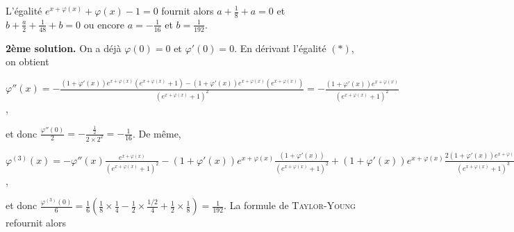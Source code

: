 {{L'égalité $e^{x+\varphi(x)}+\varphi(x)-1=0$ fournit alors $a+ \frac{1}{8}+a=0$ et $b+ \frac{a}{2}+ \frac{1}{48}+b=0$ ou encore $a=- \frac{1}{16}$ et $b= \frac{1}{192}$.

\textbf{2ème solution.} On a déjà $\varphi(0)=0$ et $\varphi'(0)=0$. En dérivant l'égalité $(*)$, on obtient

\begin{center}
$\varphi''(x)=- \frac{(1+\varphi'(x))e^{x+\varphi(x)}(e^{x+\varphi(x)}+1)-(1+\varphi'(x))e^{x+\varphi(x)}(e^{x+\varphi(x)})}{\left(e^{x+\varphi(x)}+1\right)^2}=- \frac{(1+\varphi'(x))e^{x+\varphi(x)}}{\left(e^{x+\varphi(x)}+1\right)^2}$,
\end{center}

et donc $ \frac{\varphi''(0)}{2}=- \frac{ \frac{1}{2}}{2\times2^2}=- \frac{1}{16}$. De même,

\begin{center}
$\varphi^{(3)}(x)=-\varphi''(x) \frac{e^{x+\varphi(x)}}{\left(e^{x+\varphi(x)}+1\right)^2}-(1+\varphi'(x))e^{x+\varphi(x)} \frac{(1+\varphi'(x))}{\left(e^{x+\varphi(x)}+1\right)^2}+(1+\varphi'(x))e^{x+\varphi(x)} \frac{2(1+\varphi'(x))e^{x+\varphi(x)}}{\left(e^{x+\varphi(x)}+1\right)^3}$,
\end{center}

et donc $ \frac{\varphi^{(3)}(0)}{6}= \frac{1}{6}\left( \frac{1}{8}\times \frac{1}{4}- \frac{1}{2}\times \frac{1/2}{4}+ \frac{1}{2}\times \frac{1}{8}\right)= \frac{1}{192}$. La formule de \textsc{Taylor}-\textsc{Young} refournit alors

\begin{center}
\end{center}}
}